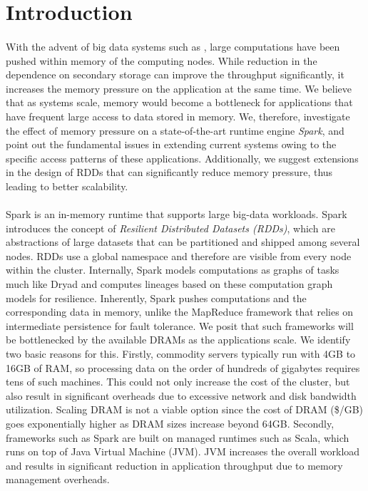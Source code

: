 \section{Introduction} 
\label{sec:intro}
\paragraph{}
With the advent of big data systems such as \cite{zaharia2012resilient,
engle2012shark, agarwal2013blinkdb}, large computations have been pushed
within memory of the computing nodes. While reduction in the dependence
on secondary storage can improve the throughput significantly, it
increases the memory pressure on the application at the same time. We
believe that as systems scale, memory would become a bottleneck for
applications that have frequent large access to data stored in memory.
We, therefore, investigate the effect of memory pressure on a
state-of-the-art runtime engine \emph{Spark}, and point out the
fundamental issues in extending current systems owing to the specific
access patterns of these applications. Additionally, we suggest
extensions in the design of RDDs that can significantly reduce memory
pressure, thus leading to better scalability. 
\paragraph{}
Spark is an in-memory runtime that supports large big-data workloads.
Spark introduces the concept of \emph{Resilient Distributed Datasets
(RDDs)}, which are abstractions of large datasets that can be
partitioned and shipped among several nodes. RDDs use a global namespace
and therefore are visible from every node within the cluster.
Internally, Spark models computations as graphs of tasks much like
Dryad \cite{isard2007dryad} and computes lineages based on  %
these computation graph models for resilience. Inherently, Spark pushes
computations and the corresponding data in memory, unlike the MapReduce
\cite{dean2008mapreduce} framework that relies on intermediate
persistence for fault tolerance. We posit that such frameworks will be
bottlenecked by the available DRAMs as the applications scale. We
identify two basic reasons for this. Firstly, commodity servers
typically run with 4GB to 16GB of RAM, so processing data on the order
of hundreds of gigabytes requires tens of such machines. This could not
only increase the cost of the cluster, but also result in significant
overheads due to excessive network and disk bandwidth utilization.
Scaling DRAM is not a viable option since the cost of DRAM (\$/GB) goes
exponentially higher as DRAM sizes increase beyond 64GB.
\cite{badam2011ssdalloc} Secondly, frameworks such as Spark are built on
managed runtimes such as Scala, which runs on top of Java Virtual
Machine (JVM). JVM increases the overall workload and results in
significant reduction in application throughput due to memory management
overheads. \cite{yang2006cramm}

